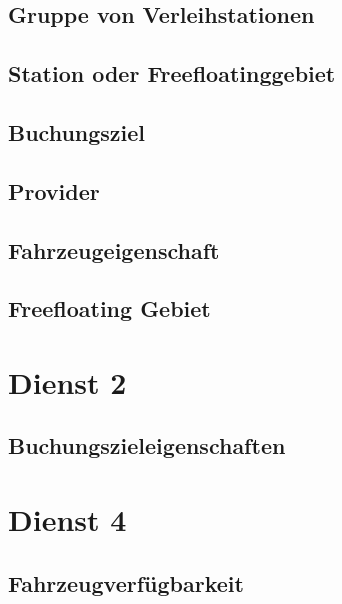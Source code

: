 \subsection*{Gruppe von Verleihstationen}


\subsection*{Station oder Freefloatinggebiet}


\subsection*{Buchungsziel}



\subsection*{Provider}



\subsection*{Fahrzeugeigenschaft}


\subsection*{Freefloating Gebiet}


\section{Dienst 2}
\label{subsec:Datenmodell:Dienst2}

\subsection*{Buchungszieleigenschaften}





\section{Dienst 4}
\label{subsec:Datenmodell:Dienst4}

\subsection*{Fahrzeugverfügbarkeit}


